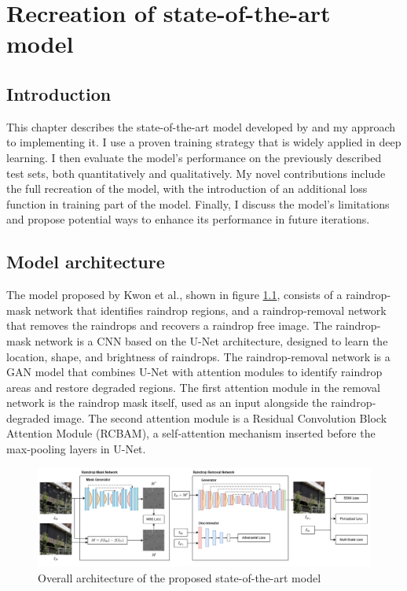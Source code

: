 \documentclass[11pt]{ociamthesis}  %
\begin{document}
\chapter{Recreation of state-of-the-art model}

\section{Introduction}

This chapter describes the state-of-the-art model developed by \cite{Kwon} and my approach to implementing it. I use a proven training strategy that is widely applied in deep learning. I then evaluate the model’s performance on the previously described test sets, both quantitatively and qualitatively. My novel contributions include the full recreation of the model, with the introduction of an additional loss function in training part of the model. Finally, I discuss the model’s limitations and propose potential ways to enhance its performance in future iterations.

\section{Model architecture}
The model proposed by Kwon et al.\cite{Kwon}, shown in figure \ref{fig:Kwon Overall Architecture}, consists of a raindrop‐mask network that identifies raindrop regions, and a raindrop‐removal network that removes the raindrops and recovers a raindrop free image. The raindrop‐mask network is a CNN based on the U-Net architecture, designed to learn the location, shape, and brightness of raindrops. The raindrop‐removal network is a GAN model that combines U-Net with attention modules to identify raindrop areas and restore degraded regions. The first attention module in the removal network is the raindrop mask itself, used as an input alongside the raindrop‐degraded image. The second attention module is a Residual Convolution Block Attention Module (RCBAM), a self‐attention mechanism inserted before the max‐pooling layers in U-Net. 

\begin{figure}
    \centering
    \includegraphics[width=0.8\linewidth]{figures/Kwon-et-al.-Overall-Architecture.png}
    \caption{Overall architecture of the proposed state-of-the-art model}
    \label{fig:Kwon Overall Architecture}
\end{figure}
\end{document}
